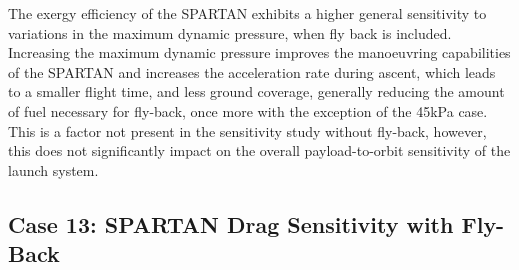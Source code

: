 The exergy efficiency of the SPARTAN exhibits a higher general sensitivity to variations in the maximum dynamic pressure, when fly back is included.
Increasing the maximum dynamic pressure improves the manoeuvring capabilities of the SPARTAN and increases the acceleration rate during ascent, which leads to a smaller flight time, and less ground coverage, generally reducing the amount of fuel necessary for fly-back, once more with the exception of the 45kPa case. This is a factor not present in the sensitivity study without fly-back, however, this does not significantly impact on the overall payload-to-orbit sensitivity of the launch system. 




\subsection{Case 13: SPARTAN Drag Sensitivity with Fly-Back}\label{sec:dragvar}


